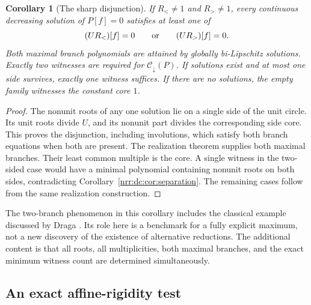 \documentclass[11pt,letterpaper]{article}
\newtheorem{corollary}[theorem]{Corollary}
\theoremstyle{definition}
\theoremstyle{remark}
\newcommand{\dcore}{\mathcal C_{\downarrow}}
\begin{document}
\begin{corollary}[The sharp disjunction]
\label{nrr:dc:cor:two-branches}
If $R_<\ne1$ and $R_>\ne1$, every continuous decreasing solution of
$P[f]=0$ satisfies at least one of
\begin{equation}
 (UR_<)[f]=0\qquad\hbox{or}\qquad (UR_>)[f]=0.
 \label{nrr:dc:eq:disjunction}
\end{equation}
Both maximal branch polynomials are attained by globally bi-Lipschitz
solutions. Exactly two witnesses are required for $\dcore(P)$.
If solutions exist and at most one side survives, exactly one witness
suffices. If there are no solutions, the empty family witnesses the
constant core $1$.
\end{corollary}
\begin{proof}
The nonunit roots of any one solution lie on a single side of the
unit circle. Its unit roots divide $U$, and its nonunit part divides
the corresponding side core. This proves the disjunction, including
involutions, which satisfy both branch equations when both are present.
The realization theorem supplies both maximal branches. Their least
common multiple is the core. A single witness in the two-sided case
would have a minimal polynomial containing nonunit roots on both sides,
contradicting Corollary~\ref{nrr:dc:cor:separation}. The remaining cases
follow from the same realization construction.
\end{proof}

The two-branch phenomenon in this corollary includes the classical
example discussed by Draga \cite[Remark~4]{D2016}. Its role here is a
benchmark for a fully explicit maximum, not a new discovery of the
existence of alternative reductions. The additional content is that
all roots, all multiplicities, both maximal branches, and the exact
minimum witness count are determined simultaneously.

\subsection{An exact affine-rigidity test}
\end{document}
